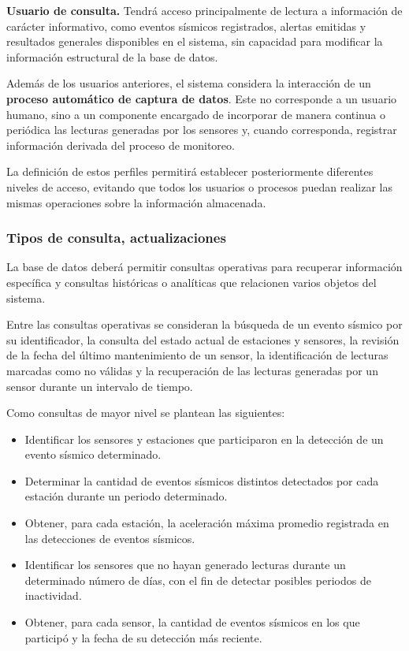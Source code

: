 \documentclass[12pt,a4paper]{article}
\begin{document}
\textbf{Usuario de consulta.}
Tendrá acceso principalmente de lectura a información de carácter informativo, como eventos sísmicos registrados, alertas emitidas y resultados generales disponibles en el sistema, sin capacidad para modificar la información estructural de la base de datos.

Además de los usuarios anteriores, el sistema considera la interacción de un \textbf{proceso automático de captura de datos}. Este no corresponde a un usuario humano, sino a un componente encargado de incorporar de manera continua o periódica las lecturas generadas por los sensores y, cuando corresponda, registrar información derivada del proceso de monitoreo.

La definición de estos perfiles permitirá establecer posteriormente diferentes niveles de acceso, evitando que todos los usuarios o procesos puedan realizar las mismas operaciones sobre la información almacenada.


\subsubsection{Tipos de consulta, actualizaciones}


La base de datos deberá permitir consultas operativas para recuperar información específica y consultas históricas o analíticas que relacionen varios objetos del sistema.

Entre las consultas operativas se consideran la búsqueda de un evento sísmico por su identificador, la consulta del estado actual de estaciones y sensores, la revisión de la fecha del último mantenimiento de un sensor, la identificación de lecturas marcadas como no válidas y la recuperación de las lecturas generadas por un sensor durante un intervalo de tiempo.

Como consultas de mayor nivel se plantean las siguientes:

\begin{itemize}
    \item Identificar los sensores y estaciones que participaron en la detección de un evento sísmico determinado.

    \item Determinar la cantidad de eventos sísmicos distintos detectados por cada estación durante un periodo determinado.

    \item Obtener, para cada estación, la aceleración máxima promedio registrada en las detecciones de eventos sísmicos.

    \item Identificar los sensores que no hayan generado lecturas durante un determinado número de días, con el fin de detectar posibles periodos de inactividad.

    \item Obtener, para cada sensor, la cantidad de eventos sísmicos en los que participó y la fecha de su detección más reciente.
\end{itemize}
\end{document}
